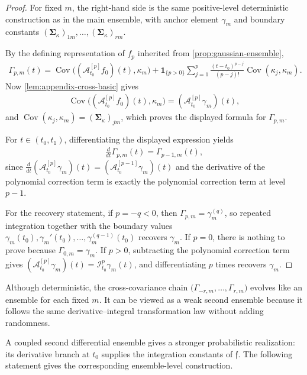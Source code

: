 \documentclass[11pt,a4paper]{article}
\theoremstyle{definition}
\theoremstyle{remark}
\DeclareMathOperator{\Cov}{Cov}
\begin{document}
\begin{proof}
For fixed \(m\), the right-hand side is the same positive-level deterministic construction as in the main ensemble, with anchor element \(\gamma_m\) and boundary constants \((\boldsymbol{\Sigma}_\kappa)_{1m},\ldots,(\boldsymbol{\Sigma}_\kappa)_{rm}\).

By the defining representation of \(f_p\) inherited from \cref{prop:gaussian-ensemble},
\begin{align*}
\Gamma_{p,m}(t)
=\Cov\bigl((\mathcal A_{t_0}^{[p]}f_0)(t),\kappa_m\bigr)+\mathbf{1}_{\{p>0\}}\sum_{j=1}^{p}\frac{(t-t_0)^{p-j}}{(p-j)!}\Cov(\kappa_j,\kappa_m).
\end{align*}
Now \cref{lem:appendix-cross-basic} gives
\begin{align*}
\Cov\bigl((\mathcal A_{t_0}^{[p]}f_0)(t),\kappa_m\bigr)=(\mathcal A_{t_0}^{[p]}\gamma_m)(t),
\end{align*}
and \(\Cov(\kappa_j,\kappa_m)=(\boldsymbol{\Sigma}_{\kappa})_{jm}\), which proves the displayed formula for \(\Gamma_{p,m}\).

For \(t\in(t_0,t_1)\), differentiating the displayed expression yields
\begin{align*}
\frac{d}{dt}\Gamma_{p,m}(t)=\Gamma_{p-1,m}(t),
\end{align*}
since \(\frac{d}{dt}(\mathcal A_{t_0}^{[p]}\gamma_m)(t)=(\mathcal A_{t_0}^{[p-1]}\gamma_m)(t)\) and the derivative of the polynomial correction term is exactly the polynomial correction term at level \(p-1\).

For the recovery statement, if \(p=-q<0\), then \(\Gamma_{p,m}=\gamma_m^{(q)}\), so repeated integration together with the boundary values \(\gamma_m(t_0),\gamma_m'(t_0),\ldots,\gamma_m^{(q-1)}(t_0)\) recovers \(\gamma_m\). If \(p=0\), there is nothing to prove because \(\Gamma_{0,m}=\gamma_m\). If \(p>0\), subtracting the polynomial correction term gives \((\mathcal A_{t_0}^{[p]}\gamma_m)(t)=\mathcal I_{t_0}^{p}\gamma_m(t)\), and differentiating \(p\) times recovers \(\gamma_m\).
\end{proof}




Although deterministic, the cross-covariance chain \(\bigl(\Gamma_{-r,m},\ldots,\Gamma_{r,m}\bigr)\) evolves like an ensemble for each fixed \(m\). It can be viewed as a weak second ensemble because it follows the same derivative--integral transformation law without adding randomness.

A coupled second differential ensemble gives a stronger probabilistic realization: its derivative branch at \(t_0\) supplies the integration constants of \(\mathfrak f\). The following statement gives the corresponding ensemble-level construction.
\end{document}
